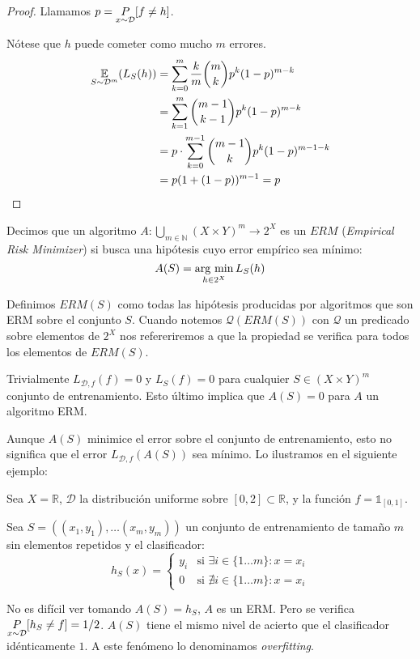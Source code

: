  \begin{proof}
   Llamamos $p= \underset{x\sim \mathcal{D}}{P} [f\neq h]$.

   Nótese que $h$ puede cometer como mucho $m$ errores.
   \begin{align*}
   \underset{S\sim \mathcal{D}^m}{\mathbb{E}}(L_S(h)) &= \sum_{k=0}^m \frac{k}{m} \binom{m}{k} p^k(1-p)^{m-k}\\
                    &= \sum_{k=1}^m \binom{m-1}{k-1} p^k(1-p)^{m-k} \\
                    &= p\cdot \sum_{k=0}^{m-1} \binom{m-1}{k} p^{k}(1-p)^{m-1-k}\\
                    &= p(1+(1-p))^{m-1} = p
   \end{align*}
  \end{proof}


\begin{definition}
Decimos que un algoritmo $A: \underset{m\in \mathbb{N}}{\bigcup} (X\times Y)^m \rightarrow 2^{X}$ es un $ERM$ 
(\textit{Empirical Risk Minimizer}) si busca una hipótesis cuyo error empírico sea mínimo:
\[
  A(S) = \operatorname*{arg\,\min}_{h\in 2^X} L_S(h)
\]
\end{definition}

Definimos $ERM(S)$ como todas las hipótesis producidas por algoritmos que son ERM
sobre el conjunto $S$. Cuando notemos $\mathcal{Q}(ERM(S))$ con $\mathcal{Q}$ un predicado sobre elementos 
de $2^X$ nos refereriremos a que la propiedad se verifica para todos los elementos de $ERM(S)$.

Trivialmente $L_{\mathcal{D},f}(f) = 0$ y $L_S(f) = 0$ para cualquier $S \in (X \times Y)^m$ conjunto de entrenamiento.
Esto último implica que $A(S) = 0$ para $A$ un algoritmo ERM.

Aunque $A(S)$ minimice el error sobre el conjunto de entrenamiento, esto no significa que el error $L_{\mathcal{D},f} (A(S))$ 
sea mínimo. Lo ilustramos en el siguiente ejemplo:

\begin{example}
Sea $X = \mathbb{R}$, $\mathcal{D}$ la distribución uniforme sobre $[0,2]\subset \mathbb{R}$, y la función
$f= \mathds{1}_{[0,1]}$.

Sea $S = ((x_1,y_1), \ldots (x_m, y_m))$ un conjunto de entrenamiento de tamaño $m$ sin elementos repetidos 
y el clasificador:
\[
  h_S(x) = \left\{\begin{array}{ll}
                   y_i & \textrm{si } \exists i\in \{1\ldots m\} : x=x_i\\
                   0   & \textrm{si } \nexists i\in \{1\ldots m\} : x=x_i
                   \end{array}\right.
\]

No es difícil ver tomando $A(S) = h_S$, $A$ es un ERM. Pero se verifica $\underset{x\sim \mathcal{D}}{P}[h_S \neq f] = 1/2$. $A(S)$ tiene el 
mismo nivel de acierto que el clasificador idénticamente $1$. A este fenómeno lo denominamos \textit{overfitting}.
\end{example}

